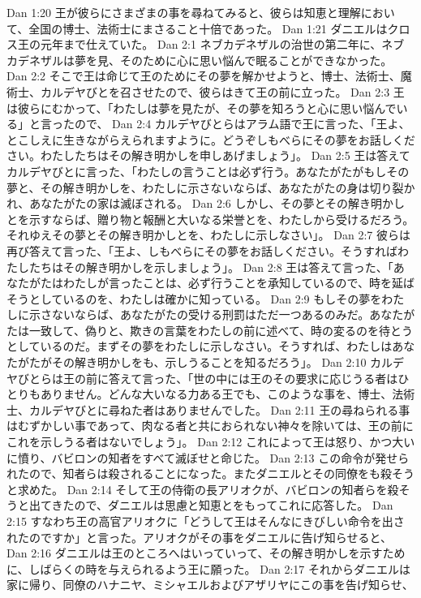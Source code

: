 Dan 1:20  王が彼らにさまざまの事を尋ねてみると、彼らは知恵と理解において、全国の博士、法術士にまさること十倍であった。
Dan 1:21  ダニエルはクロス王の元年まで仕えていた。
Dan 2:1  ネブカデネザルの治世の第二年に、ネブカデネザルは夢を見、そのために心に思い悩んで眠ることができなかった。
Dan 2:2  そこで王は命じて王のためにその夢を解かせようと、博士、法術士、魔術士、カルデヤびとを召させたので、彼らはきて王の前に立った。
Dan 2:3  王は彼らにむかって、「わたしは夢を見たが、その夢を知ろうと心に思い悩んでいる」と言ったので、
Dan 2:4  カルデヤびとらはアラム語で王に言った、「王よ、とこしえに生きながらえられますように。どうぞしもべらにその夢をお話しください。わたしたちはその解き明かしを申しあげましょう」。
Dan 2:5  王は答えてカルデヤびとに言った、「わたしの言うことは必ず行う。あなたがたがもしその夢と、その解き明かしを、わたしに示さないならば、あなたがたの身は切り裂かれ、あなたがたの家は滅ぼされる。
Dan 2:6  しかし、その夢とその解き明かしとを示すならば、贈り物と報酬と大いなる栄誉とを、わたしから受けるだろう。それゆえその夢とその解き明かしとを、わたしに示しなさい」。
Dan 2:7  彼らは再び答えて言った、「王よ、しもべらにその夢をお話しください。そうすればわたしたちはその解き明かしを示しましょう」。
Dan 2:8  王は答えて言った、「あなたがたはわたしが言ったことは、必ず行うことを承知しているので、時を延ばそうとしているのを、わたしは確かに知っている。
Dan 2:9  もしその夢をわたしに示さないならば、あなたがたの受ける刑罰はただ一つあるのみだ。あなたがたは一致して、偽りと、欺きの言葉をわたしの前に述べて、時の変るのを待とうとしているのだ。まずその夢をわたしに示しなさい。そうすれば、わたしはあなたがたがその解き明かしをも、示しうることを知るだろう」。
Dan 2:10  カルデヤびとらは王の前に答えて言った、「世の中には王のその要求に応じうる者はひとりもありません。どんな大いなる力ある王でも、このような事を、博士、法術士、カルデヤびとに尋ねた者はありませんでした。
Dan 2:11  王の尋ねられる事はむずかしい事であって、肉なる者と共におられない神々を除いては、王の前にこれを示しうる者はないでしょう」。
Dan 2:12  これによって王は怒り、かつ大いに憤り、バビロンの知者をすべて滅ぼせと命じた。
Dan 2:13  この命令が発せられたので、知者らは殺されることになった。またダニエルとその同僚をも殺そうと求めた。
Dan 2:14  そして王の侍衛の長アリオクが、バビロンの知者らを殺そうと出てきたので、ダニエルは思慮と知恵とをもってこれに応答した。
Dan 2:15  すなわち王の高官アリオクに「どうして王はそんなにきびしい命令を出されたのですか」と言った。アリオクがその事をダニエルに告げ知らせると、
Dan 2:16  ダニエルは王のところへはいっていって、その解き明かしを示すために、しばらくの時を与えられるよう王に願った。
Dan 2:17  それからダニエルは家に帰り、同僚のハナニヤ、ミシャエルおよびアザリヤにこの事を告げ知らせ、
